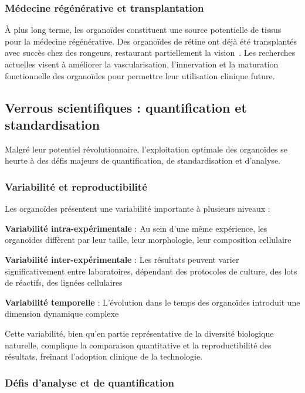 \subsubsection{Médecine régénérative et transplantation}

À plus long terme, les organoïdes constituent une source potentielle de tissus pour la médecine régénérative. Des organoïdes de rétine ont déjà été transplantés avec succès chez des rongeurs, restaurant partiellement la vision~\cite{Lin2020}. Les recherches actuelles visent à améliorer la vascularisation, l'innervation et la maturation fonctionnelle des organoïdes pour permettre leur utilisation clinique future.

\subsection{Verrous scientifiques : quantification et standardisation}

Malgré leur potentiel révolutionnaire, l'exploitation optimale des organoïdes se heurte à des défis majeurs de quantification, de standardisation et d'analyse.

\subsubsection{Variabilité et reproductibilité}

Les organoïdes présentent une variabilité importante à plusieurs niveaux :

\textbf{Variabilité intra-expérimentale} : Au sein d'une même expérience, les organoïdes diffèrent par leur taille, leur morphologie, leur composition cellulaire

\textbf{Variabilité inter-expérimentale} : Les résultats peuvent varier significativement entre laboratoires, dépendant des protocoles de culture, des lots de réactifs, des lignées cellulaires

\textbf{Variabilité temporelle} : L'évolution dans le temps des organoïdes introduit une dimension dynamique complexe


Cette variabilité, bien qu'en partie représentative de la diversité biologique naturelle, complique la comparaison quantitative et la reproductibilité des résultats, freînant l'adoption clinique de la technologie.

\subsubsection{Défis d'analyse et de quantification}

